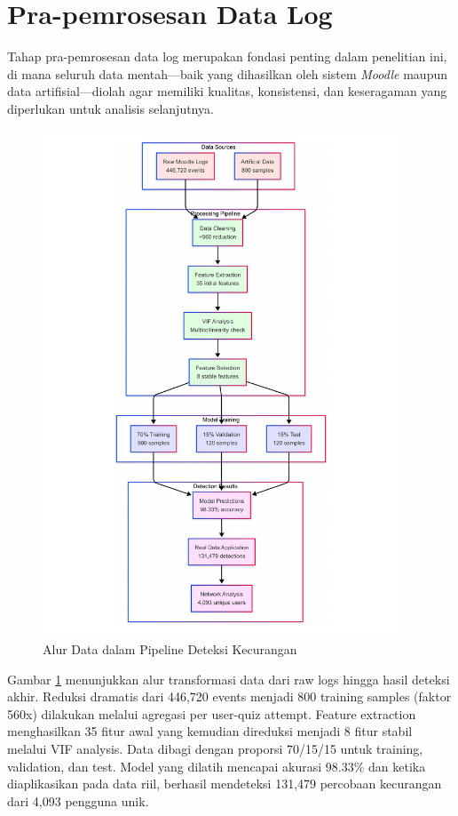\section{Pra-pemrosesan Data Log}
\label{sec:praPemrosesanDataLog}
Tahap pra-pemrosesan data log merupakan fondasi penting dalam penelitian ini, di mana seluruh data mentah—baik yang dihasilkan oleh sistem \textit{Moodle} maupun data artifisial—diolah agar memiliki kualitas, konsistensi, dan keseragaman yang diperlukan untuk analisis selanjutnya. 

\begin{figure}[htbp]
    \centering
    \includegraphics[width=0.95\textwidth]{figures/data_flow_diagram.pdf}
    \caption{Alur Data dalam Pipeline Deteksi Kecurangan}
    \label{fig:data_flow}
\end{figure}

Gambar \ref{fig:data_flow} menunjukkan alur transformasi data dari raw logs hingga hasil deteksi akhir. Reduksi dramatis dari 446,720 events menjadi 800 training samples (faktor 560x) dilakukan melalui agregasi per user-quiz attempt. Feature extraction menghasilkan 35 fitur awal yang kemudian direduksi menjadi 8 fitur stabil melalui VIF analysis. Data dibagi dengan proporsi 70/15/15 untuk training, validation, dan test. Model yang dilatih mencapai akurasi 98.33\% dan ketika diaplikasikan pada data riil, berhasil mendeteksi 131,479 percobaan kecurangan dari 4,093 pengguna unik.

